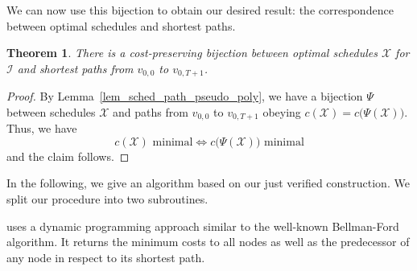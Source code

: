 \documentclass[hidelinks]{article}
\theoremstyle{plain}
\newtheorem{thm}{Theorem}[section]
\theoremstyle{definition}
\theoremstyle{rem}
\newcommand{\mx}{\mathcal{X}}
\newcommand{\inp}{\mathcal{I}}
\newcommand{\costs}{c}
\begin{document}
We can now use this bijection to obtain our desired result: the correspondence between optimal schedules and shortest paths.
\begin{thm}\label{thm_opt_sched_short_path_pseudo_poly}
There is a cost-preserving bijection between optimal schedules $\mx$ for $\inp$ and shortest paths from $v_{0,0}$ to $v_{0,T+1}$.
\end{thm} 
\begin{proof}
By Lemma~\ref{lem_sched_path_pseudo_poly}, we have a bijection $\Psi$ between schedules $\mx$ and paths from $v_{0,0}$ to $v_{0,T+1}$ obeying $\costs(\mx)=\costs\bigl(\Psi(\mx)\bigr)$. Thus, we have 
\begin{equation*}
	\costs(\mx)\text{ minimal}\iff \costs\bigl(\Psi(\mx)\big)\text{ minimal}
\end{equation*}
and the claim follows.
\end{proof}
In the following, we give an algorithm based on our just verified construction. 
We split our procedure into two subroutines. 

 uses a dynamic programming approach similar to the well-known Bellman-Ford algorithm. It returns the minimum costs to all nodes as well as the predecessor of any node in respect to its shortest path.
\end{document}
